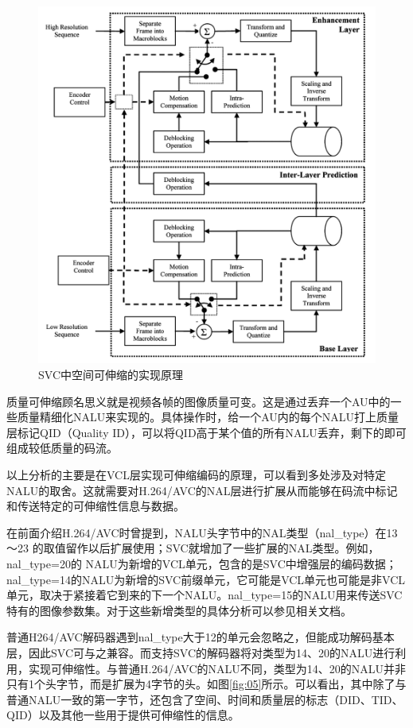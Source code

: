 \begin{figure}[!ht]
	\centering
	\includegraphics[width = 1.0\linewidth]{clip/04-1.png}
	\caption{SVC中空间可伸缩的实现原理\label{fig:04-1}}
\end{figure}

质量可伸缩顾名思义就是视频各帧的图像质量可变。这是通过丢弃一个AU中的一些质量精细化NALU来实现的。具体操作时，给一个AU内的每个NALU打上质量层标记QID（Quality ID），可以将QID高于某个值的所有NALU丢弃，剩下的即可组成较低质量的码流。

以上分析的主要是在VCL层实现可伸缩编码的原理，可以看到多处涉及对特定
NALU的取舍。这就需要对H.264/AVC的NAL层进行扩展从而能够在码流中标记和传送特定的可伸缩性信息与数据。

在前面介绍H.264/AVC时曾提到，NALU头字节中的NAL类型（nal\_type）在13～23
的取值留作以后扩展使用；SVC就增加了一些扩展的NAL类型。例如，nal\_type=20的
NALU为新增的VCL单元，包含的是SVC中增强层的编码数据；nal\_type=14的NALU为新增的SVC前缀单元，它可能是VCL单元也可能是非VCL单元，取决于紧接着它到来的下一个NALU。nal\_type=15的NALU用来传送SVC特有的图像参数集。对于这些新增类型的具体分析可以参见相关文档\supercite{SVC-Interface}。

普通H264/AVC解码器遇到nal\_type大于12的单元会忽略之，但能成功解码基本层，因此SVC可与之兼容。而支持SVC的解码器将对类型为14、20的NALU进行利用，实现可伸缩性。与普通H.264/AVC的NALU不同，类型为14、20的NALU并非只有1个头字节，而是扩展为4字节的头。如图\ref{fig:05}\supercite{SVC-Interface}所示。可以看出，其中除了与普通NALU一致的第一字节，还包含了空间、时间和质量层的标志（DID、TID、QID）以及其他一些用于提供可伸缩性的信息。

